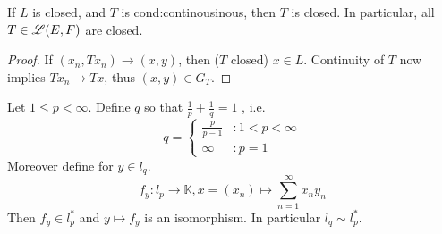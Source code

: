 \begin{rem}
	If $L$ is closed, and $T$ is cond:continousinous, then $T$ is closed. In particular, all $T \in \mathscr L(E,F)$ are closed.
\end{rem}
\begin{proof}
	If $(x_n,Tx_n) \to (x,y)$, then ($T$ closed) $x \in L$. Continuity of $T$ now implies $Tx_n \to Tx$, thus $(x,y) \in G_T$.
\end{proof}

\begin{theo}
 	Let $1 \leq p < \infty$. Define $q$ so that $\frac{1}{p} + \frac{1}{q}=1$ , i.e.
 	\[
 	q= \begin{cases} \frac{p}{p-1} &: 1<p<\infty \\ \infty &: p=1 \end{cases}
 	\]
 	Moreover define for $y \in l_q$.
	\[
		f_y : l_p \to \mathbb{K}, x= (x_n) \mapsto \sum_{n=1}^{\infty} x_ny_n
	\]
	Then $f_y \in l_p^{\ast}$ and $y \mapsto f_y$ is an isomorphism.
	In particular $l_q \sim l_p^{\ast}$.
\end{theo}

